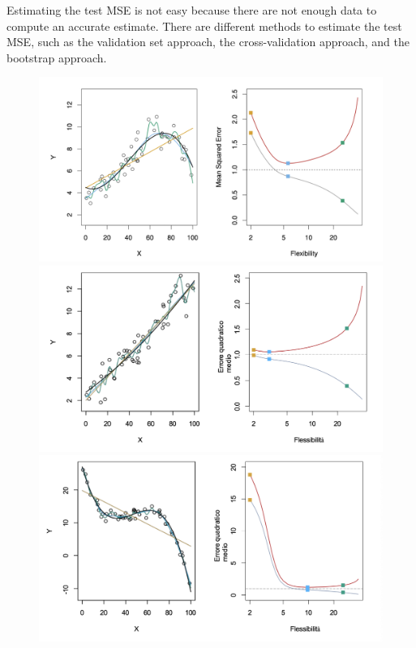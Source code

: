 Estimating the test MSE is not easy because there are not enough data to compute an accurate estimate. There are different methods to estimate the test MSE, such as the validation set approach, the cross-validation approach, and the bootstrap approach.

\begin{figure}
    \centering
    \begin{minipage}[b]{0.7\textwidth}
        \includegraphics[width=\textwidth]{./figures/intro/flexibilityexample1.png}
    \end{minipage}
    \begin{minipage}[b]{0.7\textwidth}
        \includegraphics[width=\textwidth]{./figures/intro/flexibilityexample2.png}
    \end{minipage}
    \begin{minipage}[b]{0.7\textwidth}
        \includegraphics[width=\textwidth]{./figures/intro/flexibilityexample3.png}

\end{minipage}
\end{figure}
